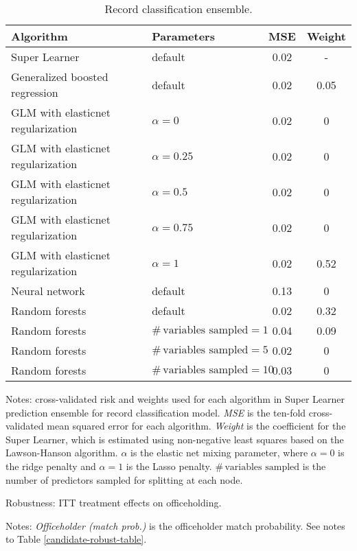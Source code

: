 \begin{table}[htbp]
	\begin{center}
		\caption{Record classification ensemble.\label{ensemble-tab-link}} 
		\begin{tabular}{llcc}
			\hline
			Algorithm & Parameters & MSE & Weight \\ 
			\hline
			\rowcolor{Gray}
			Super Learner & default & 0.02 & - \\
			Generalized boosted regression &  default & 0.02 & 0.05 \\ 
			GLM with elasticnet regularization	 &  $\alpha=0$ & 0.02 & 0 \\  %
			GLM with elasticnet regularization	 &  $\alpha=0.25$ & 0.02& 0 \\ 
			GLM with elasticnet regularization 	&  $\alpha=0.5$ & 0.02 & 0 \\ 
			GLM with elasticnet regularization 	 &  $\alpha=0.75$ & 0.02 & 0 \\ 
			GLM with elasticnet regularization 	 &  $\alpha=1$ & 0.02 & 0.52 \\  %
			Neural network  &  default & 0.13 & 0 \\ 
			Random forests 	& default & 0.02 & 0.32 \\ 
			Random forests 	 & $\# \, \text{variables sampled} =1$ & 0.04 & 0.09 \\ 
			Random forests 	  & $\# \, \text{variables sampled}=5$  & 0.02 & 0 \\ 
			Random forests 	 & $\# \, \text{variables sampled}=10$ & 0.03 & 0 \\ 
			\hline
		\end{tabular} 
	\end{center}
	\footnotesize{Notes: cross-validated risk and weights used for each algorithm in Super Learner prediction ensemble for record classification model. \textit{MSE} is the ten-fold cross-validated mean squared error for each algorithm. \textit{Weight} is the coefficient for the Super Learner, which is estimated using non-negative least squares based on the Lawson-Hanson algorithm. $\alpha$ is the elastic net mixing parameter, where $\alpha = 0$ is the ridge penalty and $\alpha = 1$ is the Lasso penalty. $\# \, \text{variables sampled}$ is the number of predictors sampled for splitting at each node.}
\end{table}

\begin{table}[htbp] 
	\begin{center}
		\caption{Robustness: ITT treatment effects on officeholding.}   \label{officeholding-robust-table}
		\resizebox{0.8\width}{!}{}
	\end{center}
	\footnotesize{Notes: \textit{Officeholder (match prob.)} is the officeholder match probability. See notes to Table \ref{candidate-robust-table}.}  
\end{table} 

